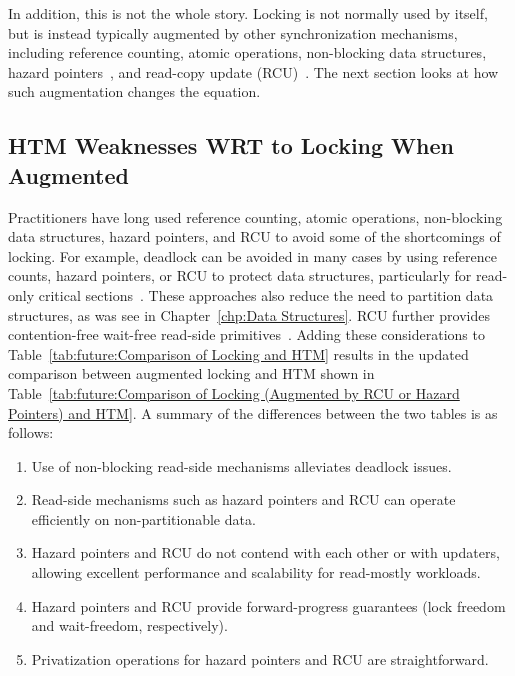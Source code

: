 In addition, this is not the whole story.
Locking is not normally used by itself, but is instead typically
augmented by other synchronization mechanisms,
including reference counting, atomic operations, non-blocking data structures,
hazard pointers~\cite{MagedMichael04a,HerlihyLM02},
and read-copy update (RCU)~\cite{McKenney98,McKenney01a,ThomasEHart2007a,PaulEMcKenney2012ELCbattery}.
The next section looks at how such augmentation changes the equation.

\subsection{HTM Weaknesses WRT to Locking When Augmented}
\label{sec:future:HTM Weaknesses WRT to Locking When Augmented}



Practitioners have long used reference counting, atomic operations,
non-blocking data structures, hazard pointers, and RCU to avoid some
of the shortcomings of locking.
For example, deadlock can be avoided in many cases by using reference
counts, hazard pointers, or RCU to protect data structures,
particularly for read-only critical
sections~\cite{MagedMichael04a,HerlihyLM02,MathieuDesnoyers2012URCU,DinakarGuniguntala2008IBMSysJ,ThomasEHart2007a}.
These approaches also reduce the need to partition data
structures, as was see in Chapter~\ref{chp:Data Structures}.
RCU further provides contention-free wait-free read-side
primitives~\cite{MathieuDesnoyers2012URCU}.
Adding these considerations to
Table~\ref{tab:future:Comparison of Locking and HTM}
results in the updated comparison between augmented locking and HTM
shown in
Table~\ref{tab:future:Comparison of Locking (Augmented by RCU or Hazard Pointers) and HTM}.
A summary of the differences between the two tables is as follows:

\begin{enumerate}
\item	Use of non-blocking read-side mechanisms alleviates deadlock issues.
\item	Read-side mechanisms such as hazard pointers and RCU can operate
	efficiently on non-partitionable data.
\item	Hazard pointers and RCU do not contend with each other or with
	updaters, allowing excellent performance and scalability for
	read-mostly workloads.
\item	Hazard pointers and RCU provide forward-progress guarantees
	(lock freedom and wait-freedom, respectively).
\item	Privatization operations for hazard pointers and RCU are
	straightforward.
\end{enumerate}

